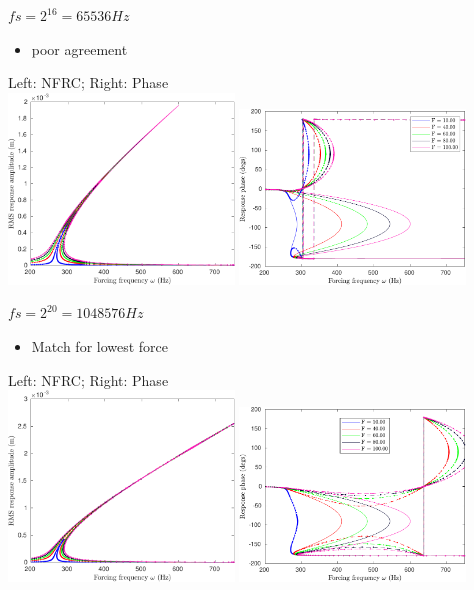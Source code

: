 \documentclass[9pt]{beamer}
\begin{document}
\begin{frame}{$fs=2^{16}=65536 Hz$}
  \begin{itemize}
  \item poor agreement
  \end{itemize}
  \begin{center}
    Left: NFRC; Right: Phase\\
    \includegraphics[width=0.45\textwidth]{fig/nfrc/dssex_frf_Amp_fs65536}
    \includegraphics[width=0.45\textwidth]{fig/nfrc/dssex_frf_Phase_fs65536}
  \end{center}
\end{frame}



\begin{frame}{$fs=2^{20}=1048576 Hz$}
  \begin{itemize}
  \item Match for lowest force
  \end{itemize}
  \begin{center}
    Left: NFRC; Right: Phase\\
    \includegraphics[width=0.45\textwidth]{fig/nfrc/dssex_frf_Amp_fs1048576}
    \includegraphics[width=0.45\textwidth]{fig/nfrc/dssex_frf_Phase_fs1048576}
  \end{center}
\end{frame}
\end{document}
